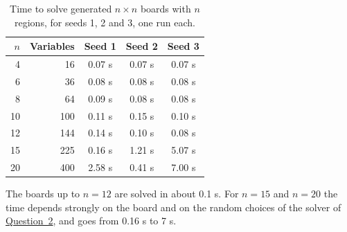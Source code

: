 \begin{table}[H]
\centering
\begin{tabular}{@{}rrccc@{}}
\toprule
$n$ & Variables & Seed 1 & Seed 2 & Seed 3\\
\midrule
4 & 16 & 0.07 s & 0.07 s & 0.07 s\\
6 & 36 & 0.08 s & 0.08 s & 0.08 s\\
8 & 64 & 0.09 s & 0.08 s & 0.08 s\\
10 & 100 & 0.11 s & 0.15 s & 0.10 s\\
12 & 144 & 0.14 s & 0.10 s & 0.08 s\\
15 & 225 & 0.16 s & 1.21 s & 5.07 s\\
20 & 400 & 2.58 s & 0.41 s & 7.00 s\\
\bottomrule
\end{tabular}
\caption{Time to solve generated $n\times n$ boards with $n$ regions, for seeds 1, 2 and 3, one run each.}
\label{tab:q3-times}
\end{table}


The boards up to $n=12$ are solved in about 0.1 s. For $n=15$ and $n=20$ the time depends strongly on the board and on the random choices of the solver of \hyperref[sec:q2]{Question~2}, and goes from 0.16 s to 7 s.

